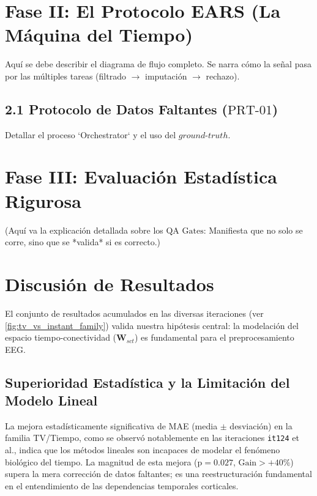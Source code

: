 \documentclass[a4paper, 12pt]{book}
\begin{document}
\section{Fase II: El Protocolo EARS (La Máquina del Tiempo)}
\label{sec:pipeline_arquitectura}
Aquí se debe describir el diagrama de flujo completo. Se narra cómo la señal pasa por las múltiples tareas (filtrado $\rightarrow$ imputación $\rightarrow$ rechazo).

\subsection{2.1 Protocolo de Datos Faltantes ($\text{PRT-01}$)} 
Detallar el proceso `Orchestrator` y el uso del $ground\text{-}truth$.

\section{Fase III: Evaluación Estadística Rigurosa}
(Aquí va la explicación detallada sobre los $\text{QA Gates}$: Manifiesta que no solo se corre, sino que se *valida* si es correcto.)


\section{Discusión de Resultados}
\label{sec:discussion_results}
El conjunto de resultados acumulados en las diversas iteraciones (ver \ref{fig:tv_vs_instant_family}) valida nuestra hipótesis central: la modelación del espacio tiempo-conectividad ($\mathbf{W}_{sct}$) es fundamental para el preprocesamiento EEG.

\subsection{Superioridad Estadística y la Limitación del Modelo Lineal}
La mejora estadísticamente significativa de MAE (media $\pm$ desviación) en la familia TV/Tiempo, como se observó notablemente en las iteraciones \texttt{it124} et al., indica que los métodos lineales son incapaces de modelar el fenómeno biológico del tiempo. La magnitud de esta mejora ($\text{p}=0.027$, $\text{Gain}>+40\%$) supera la mera corrección de datos faltantes; es una reestructuración fundamental en el entendimiento de las dependencias temporales corticales.
\end{document}
